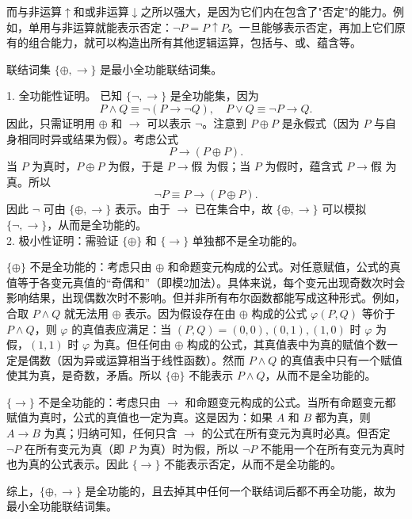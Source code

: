 而与非运算$\uparrow$和或非运算$\downarrow$之所以强大，是因为它们内在包含了"否定"的能力。例如，单用与非运算就能表示否定：$\neg P = P \uparrow P$。一旦能够表示否定，再加上它们原有的组合能力，就可以构造出所有其他逻辑运算，包括与、或、蕴含等。
\begin{example}{}{}
联结词集 $\{\oplus, \rightarrow\}$ 是最小全功能联结词集。
\end{example}
\begin{solution}
1. 全功能性证明。
已知 $\{\neg, \rightarrow\}$ 是全功能集，因为
\[
P \land Q \equiv \neg(P \rightarrow \neg Q), \quad
P \lor Q \equiv \neg P \rightarrow Q.
\]
因此，只需证明用 $\oplus$ 和 $\rightarrow$ 可以表示 $\neg$。注意到 $P \oplus P$ 是永假式（因为 $P$ 与自身相同时异或结果为假）。考虑公式
\[
P \rightarrow (P \oplus P).
\]
当 $P$ 为真时，$P \oplus P$ 为假，于是 $P \rightarrow \text{假}$ 为假；当 $P$ 为假时，蕴含式 $P \rightarrow \text{假}$ 为真。所以
\[
\neg P \equiv P \rightarrow (P \oplus P).
\]
因此 $\neg$ 可由 $\{\oplus, \rightarrow\}$ 表示。由于 $\rightarrow$ 已在集合中，故 $\{\oplus, \rightarrow\}$ 可以模拟 $\{\neg, \rightarrow\}$，从而是全功能的。
\\2. 极小性证明：需验证 $\{\oplus\}$ 和 $\{\rightarrow\}$ 单独都不是全功能的。

$\{\oplus\}$ 不是全功能的：考虑只由 $\oplus$ 和命题变元构成的公式。对任意赋值，公式的真值等于各变元真值的“奇偶和”（即模2加法）。具体来说，每个变元出现奇数次时会影响结果，出现偶数次时不影响。但并非所有布尔函数都能写成这种形式。例如，合取 $P \land Q$ 就无法用 $\oplus$ 表示。因为假设存在由 $\oplus$ 构成的公式 $\varphi(P,Q)$ 等价于 $P \land Q$，则 $\varphi$ 的真值表应满足：当 $(P,Q)=(0,0),(0,1),(1,0)$ 时 $\varphi$ 为假，$(1,1)$ 时 $\varphi$ 为真。但任何由 $\oplus$ 构成的公式，其真值表中为真的赋值个数一定是偶数（因为异或运算相当于线性函数）。然而 $P \land Q$ 的真值表中只有一个赋值使其为真，是奇数，矛盾。所以 $\{\oplus\}$ 不能表示 $P \land Q$，从而不是全功能的。

 $\{\rightarrow\}$ 不是全功能的：考虑只由 $\rightarrow$ 和命题变元构成的公式。当所有命题变元都赋值为真时，公式的真值也一定为真。这是因为：如果 $A$ 和 $B$ 都为真，则 $A \rightarrow B$ 为真；归纳可知，任何只含 $\rightarrow$ 的公式在所有变元为真时必真。但否定 $\neg P$ 在所有变元为真（即 $P$ 为真）时为假，所以 $\neg P$ 不能用一个在所有变元为真时也为真的公式表示。因此 $\{\rightarrow\}$ 不能表示否定，从而不是全功能的。

综上，$\{\oplus, \rightarrow\}$ 是全功能的，且去掉其中任何一个联结词后都不再全功能，故为最小全功能联结词集。
\end{solution}
